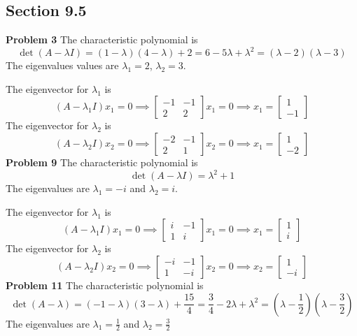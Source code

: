 \subsection*{Section 9.5}
\textbf{Problem 3}
The characteristic polynomial is 
\[
    \det(A-\lambda I) 
    = (1-\lambda)(4-\lambda) + 2
    = 6 - 5\lambda + \lambda^2
    = (\lambda - 2)(\lambda - 3)
\]
The eigenvalues values are $\lambda_1 = 2$, $\lambda_2 = 3$.

The eigenvector for $\lambda_1$ is
\[
    (A-\lambda_1 I)x_1 = 0
    \implies 
    \begin{bmatrix}
        -1 & -1 \\
        2 & 2
    \end{bmatrix} x_1 = 0
    \implies x_1 = 
    \begin{bmatrix}
        1 \\ -1
    \end{bmatrix}
\]
The eigenvector for $\lambda_2$ is
\[
    (A-\lambda_2 I)x_2 = 0
    \implies 
    \begin{bmatrix}
        -2 & -1 \\
        2 & 1
    \end{bmatrix} x_2 = 0
    \implies x_1 = 
    \begin{bmatrix}
        1 \\ -2
    \end{bmatrix}
\]
\textbf{Problem 9}
The characteristic polynomial is 
\[
    \det(A-\lambda I)
    = \lambda^2 + 1
\]
The eigenvalues are $\lambda_1 = -i$ and $\lambda_2 = i$.

The eigenvector for $\lambda_1$ is 
\[
    (A-\lambda_1 I)x_1 = 0
    \implies 
    \begin{bmatrix}
        i & -1 \\
        1 & i
    \end{bmatrix} x_1 = 0
    \implies x_1 = 
    \begin{bmatrix}
        1 \\ i
    \end{bmatrix}
\]
The eigenvector for $\lambda_2$ is 
\[
    (A-\lambda_2 I)x_2 = 0
    \implies 
    \begin{bmatrix}
        -i & -1 \\
        1 & -i
    \end{bmatrix} x_2 = 0
    \implies x_2 = 
    \begin{bmatrix}
        1 \\ -i
    \end{bmatrix}
\]
\textbf{Problem 11}
The characteristic polynomial is 
\[
    \det(A-\lambda)
    = (-1-\lambda)(3-\lambda) + \frac{15}{4}
    = \frac{3}{4} - 2\lambda + \lambda^2
    = (\lambda-\frac{1}{2})(\lambda-\frac{3}{2})
\]
The eigenvalues are $\lambda_1 = \frac{1}{2}$ and $\lambda_2 = \frac{3}{2}$

